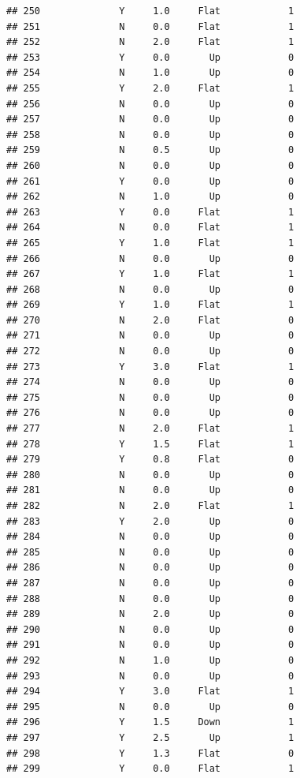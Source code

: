\documentclass[
]{article}
\begin{document}
\begin{verbatim}
## 250              Y     1.0     Flat            1
## 251              N     0.0     Flat            1
## 252              N     2.0     Flat            1
## 253              Y     0.0       Up            0
## 254              N     1.0       Up            0
## 255              Y     2.0     Flat            1
## 256              N     0.0       Up            0
## 257              N     0.0       Up            0
## 258              N     0.0       Up            0
## 259              N     0.5       Up            0
## 260              N     0.0       Up            0
## 261              Y     0.0       Up            0
## 262              N     1.0       Up            0
## 263              Y     0.0     Flat            1
## 264              N     0.0     Flat            1
## 265              Y     1.0     Flat            1
## 266              N     0.0       Up            0
## 267              Y     1.0     Flat            1
## 268              N     0.0       Up            0
## 269              Y     1.0     Flat            1
## 270              N     2.0     Flat            0
## 271              N     0.0       Up            0
## 272              N     0.0       Up            0
## 273              Y     3.0     Flat            1
## 274              N     0.0       Up            0
## 275              N     0.0       Up            0
## 276              N     0.0       Up            0
## 277              N     2.0     Flat            1
## 278              Y     1.5     Flat            1
## 279              Y     0.8     Flat            0
## 280              N     0.0       Up            0
## 281              N     0.0       Up            0
## 282              N     2.0     Flat            1
## 283              Y     2.0       Up            0
## 284              N     0.0       Up            0
## 285              N     0.0       Up            0
## 286              N     0.0       Up            0
## 287              N     0.0       Up            0
## 288              N     0.0       Up            0
## 289              N     2.0       Up            0
## 290              N     0.0       Up            0
## 291              N     0.0       Up            0
## 292              N     1.0       Up            0
## 293              N     0.0       Up            0
## 294              Y     3.0     Flat            1
## 295              N     0.0       Up            0
## 296              Y     1.5     Down            1
## 297              Y     2.5       Up            1
## 298              Y     1.3     Flat            0
## 299              Y     0.0     Flat            1

\end{verbatim}
\end{document}
